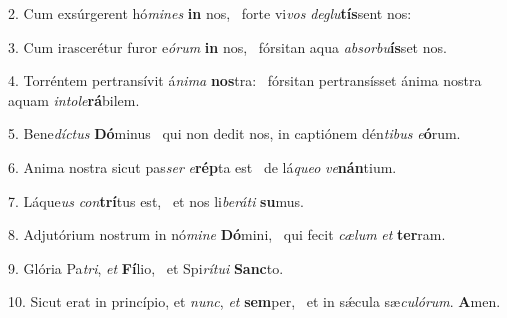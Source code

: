 2. Cum exsúrgerent hó\textit{mi}\textit{nes} \textbf{in} nos, \ast\  forte vi\textit{vos} \textit{de}\textit{glu}\textbf{tís}sent nos:\

3. Cum irascerétur furor e\textit{ó}\textit{rum} \textbf{in} nos, \ast\  fórsitan aqua \textit{ab}\textit{sor}\textit{bu}\textbf{ís}set nos.\

4. Torréntem pertransívit á\textit{ni}\textit{ma} \textbf{nos}tra: \ast\  fórsitan pertransísset ánima nostra aquam \textit{in}\textit{to}\textit{le}\textbf{rá}bilem.\

5. Bene\textit{díc}\textit{tus} \textbf{Dó}minus \ast\  qui non dedit nos, in captiónem dén\textit{ti}\textit{bus} \textit{e}\textbf{ó}rum.\

6. Anima nostra sicut pas\textit{ser} \textit{e}\textbf{rép}ta est \ast\  de lá\textit{que}\textit{o} \textit{ve}\textbf{nán}tium.\

7. Láque\textit{us} \textit{con}\textbf{trí}tus est, \ast\  et nos li\textit{be}\textit{rá}\textit{ti} \textbf{su}mus.\

8. Adjutórium nostrum in nó\textit{mi}\textit{ne} \textbf{Dó}mini, \ast\  qui fecit \textit{cæ}\textit{lum} \textit{et} \textbf{ter}ram.\

9. Glória Pa\textit{tri}, \textit{et} \textbf{Fí}lio, \ast\  et Spi\textit{rí}\textit{tu}\textit{i} \textbf{Sanc}to.\

10. Sicut erat in princípio, et \textit{nunc}, \textit{et} \textbf{sem}per, \ast\  et in sǽcula sæ\textit{cu}\textit{ló}\textit{rum}. \textbf{A}men.\

